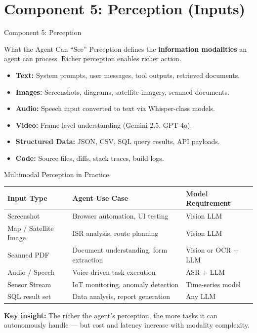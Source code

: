 \documentclass{beamer}       %
\begin{document}
\section{Component 5: Perception (Inputs)}

\begin{frame}{Component 5: Perception}
    \begin{block}{What the Agent Can ``See''}
        Perception defines the \textbf{information modalities} an agent can process. Richer perception enables richer action.
    \end{block}
    \vspace{0.2cm}
    \begin{itemize}
        \item \textbf{Text:} System prompts, user messages, tool outputs, retrieved documents.
        \item \textbf{Images:} Screenshots, diagrams, satellite imagery, scanned documents.
        \item \textbf{Audio:} Speech input converted to text via Whisper-class models.
        \item \textbf{Video:} Frame-level understanding (Gemini 2.5, GPT-4o).
        \item \textbf{Structured Data:} JSON, CSV, SQL query results, API payloads.
        \item \textbf{Code:} Source files, diffs, stack traces, build logs.
    \end{itemize}
\end{frame}

\begin{frame}{Multimodal Perception in Practice}
    \small
    \begin{table}[]
        \centering
        \begin{tabular}{@{}lll@{}}
            \toprule
            \textbf{Input Type}   & \textbf{Agent Use Case}                     & \textbf{Model Requirement} \\ \midrule
            Screenshot            & Browser automation, UI testing               & Vision LLM \\
            Map / Satellite Image & ISR analysis, route planning                & Vision LLM \\
            Scanned PDF           & Document understanding, form extraction      & Vision or OCR + LLM \\
            Audio / Speech        & Voice-driven task execution                  & ASR $+$ LLM \\
            Sensor Stream         & IoT monitoring, anomaly detection            & Time-series model \\
            SQL result set        & Data analysis, report generation             & Any LLM \\
            \bottomrule
        \end{tabular}
    \end{table}
    \vspace{0.1cm}
    \textbf{Key insight:} The richer the agent's perception, the more tasks it can autonomously handle --- but cost and latency increase with modality complexity.
\end{frame}
\end{document}
